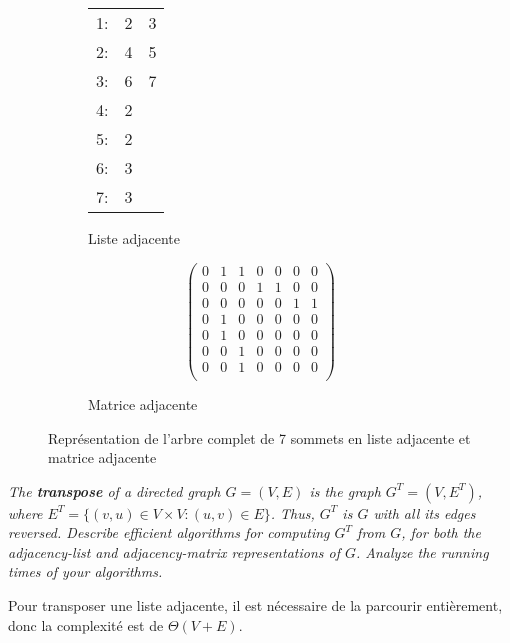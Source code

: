 \begin{description}
\begin{ex}
\begin{figure}[H]
\begin{subfigure}{0.45\textwidth}
\begin{table}[H]
\centering
\begin{tabular}{lll}
1: & 2 & 3 \\
2: & 4 & 5 \\
3: & 6 & 7 \\
4: & 2 &   \\
5: & 2 &   \\
6: & 3 &   \\
7: & 3 &  
\end{tabular}
\end{table}
\caption{Liste adjacente}
\end{subfigure}
\begin{subfigure}{0.45\textwidth}
\begin{center}
$$
\begin{pmatrix}
  0 & 1 & 1 & 0 & 0 & 0 & 0\\
  0 & 0 & 0 & 1 & 1 & 0 & 0\\
  0 & 0 & 0 & 0 & 0 & 1 & 1\\
  0 & 1 & 0 & 0 & 0 & 0 & 0\\
  0 & 1 & 0 & 0 & 0 & 0 & 0\\
  0 & 0 & 1 & 0 & 0 & 0 & 0\\
  0 & 0 & 1 & 0 & 0 & 0 & 0\\
\end{pmatrix}
$$
\end{center}
\caption{Matrice adjacente}
\end{subfigure}
\caption{Représentation de l'arbre complet de 7 sommets en liste adjacente et matrice adjacente}
\end{figure}
\end{ex}
 \textit{The \textbf{transpose} of a directed graph $G = (V, E)$ is the graph $G^T = (V, E^T)$, where $E^T = \{(v,u) \in V \times V : (u,v) \in E \}$. Thus, $G^T$ is $G$ with all its edges reversed.  Describe efficient algorithms for computing $G^T$ from $G$, for both the adjacency-list and adjacency-matrix representations of $G$. Analyze the running times of your algorithms.}    
\begin{ex}
Pour transposer une liste adjacente, il est nécessaire de la parcourir entièrement, donc la complexité est de $\Theta(V + E)$.
\begin{codebox}

\end{codebox}
\end{ex}
\end{description}
